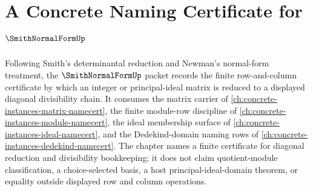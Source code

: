 \chapter{A Concrete Naming Certificate for $\SmithNormalFormUp$}
\label{ch:concrete-instances-smith-normal-form-namecert}

Following Smith's determinantal reduction and Newman's normal-form treatment, the $\SmithNormalFormUp$ packet records the finite row-and-column certificate by which an integer or principal-ideal matrix is reduced to a displayed diagonal divisibility chain. It consumes the matrix carrier of \autoref{ch:concrete-instances-matrix-namecert}, the finite module-row discipline of \autoref{ch:concrete-instances-module-namecert}, the ideal membership surface of \autoref{ch:concrete-instances-ideal-namecert}, and the Dedekind-domain naming rows of \autoref{ch:concrete-instances-dedekind-namecert}. The chapter names a finite certificate for diagonal reduction and divisibility bookkeeping; it does not claim quotient-module classification, a choice-selected basis, a host principal-ideal-domain theorem, or equality outside displayed row and column operations.

